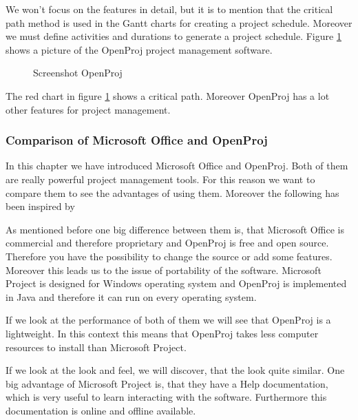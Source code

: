 We won't focus on the features in detail, but it is to mention that the critical path method is used in the Gantt charts for creating a project schedule. Moreover we must define activities and durations to generate a project schedule. Figure \ref{pic:openproj} shows a picture of the OpenProj project management software.

\begin{figure}[h!!] 
\centerline{}
\caption{Screenshot OpenProj \cite{opr}}
\label{pic:openproj}
\end{figure}

The red chart in figure \ref{pic:openproj} shows a critical path. Moreover OpenProj has a lot other features for project management.
\subsubsection{Comparison of Microsoft Office and OpenProj}
In this chapter we have introduced Microsoft Office and OpenProj. Both of them are really powerful project management tools. For this reason we want to compare them to see the advantages of using them. Moreover the following has been inspired by \cite{bright_comparison}

As mentioned before one big difference between them is, that Microsoft Office is commercial and therefore proprietary and OpenProj is free and open source. Therefore you have the possibility to change the source or add some features.
Moreover this leads us to the issue of  portability of the software. Microsoft Project is designed for Windows operating system and OpenProj is implemented in Java and therefore it can run on every operating system.

If we look at the performance of both of them we will see that OpenProj is a lightweight. In this context this means that OpenProj takes less computer resources to install than Microsoft Project.

If we look at the look and feel, we will discover, that the look quite similar. One big advantage of Microsoft Project is, that they have a Help documentation, which is very useful to learn interacting with the software. Furthermore this documentation is online and offline available.

